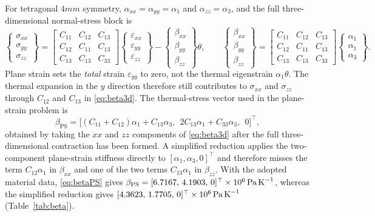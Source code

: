 \documentclass[a4paper,12pt]{elsarticle}
\begin{document}
For tetragonal $4mm$ symmetry, $\alpha_{xx}=\alpha_{yy}=\alpha_1$ and
$\alpha_{zz}=\alpha_3$, and the full three-dimensional normal-stress block is
{\footnotesize\setlength{\arraycolsep}{2pt}
\begin{equation}
\begin{Bmatrix}\sigma_{xx}\\\sigma_{yy}\\\sigma_{zz}\end{Bmatrix}
=
\begin{bmatrix}
C_{11}&C_{12}&C_{13}\\
C_{12}&C_{11}&C_{13}\\
C_{13}&C_{13}&C_{33}
\end{bmatrix}
\begin{Bmatrix}\varepsilon_{xx}\\\varepsilon_{yy}\\\varepsilon_{zz}\end{Bmatrix}
-
\begin{Bmatrix}\beta_{xx}\\\beta_{yy}\\\beta_{zz}\end{Bmatrix}\theta,
\qquad
\begin{Bmatrix}\beta_{xx}\\\beta_{yy}\\\beta_{zz}\end{Bmatrix}
=
\begin{bmatrix}
C_{11}&C_{12}&C_{13}\\
C_{12}&C_{11}&C_{13}\\
C_{13}&C_{13}&C_{33}
\end{bmatrix}
\begin{Bmatrix}\alpha_1\\\alpha_1\\\alpha_3\end{Bmatrix}.
\label{eq:beta3d}
\end{equation}
}
Plane strain sets the \emph{total} strain $\varepsilon_{yy}$ to zero, not the thermal
eigenstrain $\alpha_1\theta$. The thermal expansion in the $y$ direction therefore
still contributes to $\sigma_{xx}$ and $\sigma_{zz}$ through $C_{12}$ and $C_{13}$ in
\eqref{eq:beta3d}. The thermal-stress vector used in the plane-strain problem is
\begin{equation}
\beta_{\mathrm{PS}}
=
\big[(C_{11}{+}C_{12})\alpha_1+C_{13}\alpha_3,\ \
2C_{13}\alpha_1+C_{33}\alpha_3,\ \
0\big]^{\!\top},
\label{eq:betaPS}
\end{equation}
obtained by taking the $xx$ and $zz$ components of \eqref{eq:beta3d} after the full
three-dimensional contraction has been formed. A simplified reduction applies the
two-component plane-strain stiffness directly to $[\alpha_1,\alpha_3,0]^\top$ and
therefore misses the term $C_{12}\alpha_1$ in $\beta_{xx}$ and one of the two terms
$C_{13}\alpha_1$ in $\beta_{zz}$. With the adopted material data,
\eqref{eq:betaPS} gives
$\beta_{\mathrm{PS}}=[6.7167,\,4.1903,\,0]^\top\times10^{6}\,\text{Pa\,K}^{-1}$,
whereas the simplified reduction gives
$[4.3623,\,1.7705,\,0]^\top\times10^{6}\,\text{Pa\,K}^{-1}$
(Table~\ref{tab:beta}).
\end{document}
